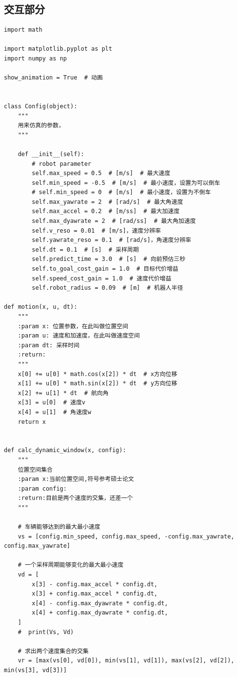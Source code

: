 \documentclass[
  oneside,
  degree=bachelor,
  fullwidthstop=false,
  fontset=fandol,
  times=false,
  minted=true,
  biblatex=true,
]{tongjithesis}
\begin{document}
\subsection{交互部分}
\begin{verbatim}
import math

import matplotlib.pyplot as plt
import numpy as np

show_animation = True  # 动画


class Config(object):
    """
    用来仿真的参数，
    """

    def __init__(self):
        # robot parameter
        self.max_speed = 0.5  # [m/s]  # 最大速度
        self.min_speed = -0.5  # [m/s]  # 最小速度，设置为可以倒车
        # self.min_speed = 0  # [m/s]  # 最小速度，设置为不倒车
        self.max_yawrate = 2  # [rad/s]  # 最大角速度
        self.max_accel = 0.2  # [m/ss]  # 最大加速度
        self.max_dyawrate = 2  # [rad/ss]  # 最大角加速度
        self.v_reso = 0.01  # [m/s]，速度分辨率
        self.yawrate_reso = 0.1  # [rad/s]，角速度分辨率
        self.dt = 0.1  # [s]  # 采样周期
        self.predict_time = 3.0  # [s]  # 向前预估三秒
        self.to_goal_cost_gain = 1.0  # 目标代价增益
        self.speed_cost_gain = 1.0  # 速度代价增益
        self.robot_radius = 0.09  # [m]  # 机器人半径

def motion(x, u, dt):
    """
    :param x: 位置参数，在此叫做位置空间
    :param u: 速度和加速度，在此叫做速度空间
    :param dt: 采样时间
    :return:
    """
    x[0] += u[0] * math.cos(x[2]) * dt  # x方向位移
    x[1] += u[0] * math.sin(x[2]) * dt  # y方向位移
    x[2] += u[1] * dt  # 航向角
    x[3] = u[0]  # 速度v
    x[4] = u[1]  # 角速度w
    return x


def calc_dynamic_window(x, config):
    """
    位置空间集合
    :param x:当前位置空间,符号参考硕士论文
    :param config:
    :return:目前是两个速度的交集，还差一个
    """

    # 车辆能够达到的最大最小速度
    vs = [config.min_speed, config.max_speed, -config.max_yawrate, config.max_yawrate]

    # 一个采样周期能够变化的最大最小速度
    vd = [
        x[3] - config.max_accel * config.dt,
        x[3] + config.max_accel * config.dt,
        x[4] - config.max_dyawrate * config.dt,
        x[4] + config.max_dyawrate * config.dt,
    ]
    #  print(Vs, Vd)

    # 求出两个速度集合的交集
    vr = [max(vs[0], vd[0]), min(vs[1], vd[1]), max(vs[2], vd[2]), min(vs[3], vd[3])]


\end{verbatim}
\end{document}
